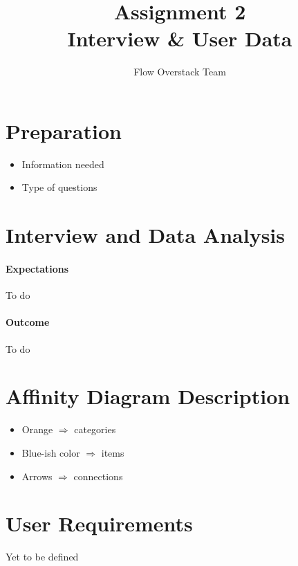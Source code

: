 \documentclass[12pt]{scrartcl}
\title{Assignment 2\\ Interview \& User Data}
\author{Flow Overstack Team}
\date{}
\begin{document}
\maketitle


\section*{Preparation}
	\begin{itemize}
		\item Information needed
		\item Type of questions
\end{itemize}


\section*{Interview and Data Analysis}
	\paragraph{Expectations}
		To do
	\paragraph{Outcome}
		To do


\section*{Affinity Diagram Description}
	\begin{itemize}
		\item Orange $\Rightarrow$ categories
		\item Blue-ish color $\Rightarrow$ items
		\item Arrows $\Rightarrow$ connections
	\end{itemize}


\section*{User Requirements}
	Yet to be defined
	
\end{document}
